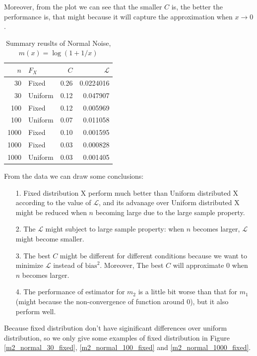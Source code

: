 \documentclass[twoside]{article}
\begin{document}
Moreover, from the plot we can see that the smaller $C$ is, the better the performance is, that might because it will capture the approximation when $x\to 0$.

\begin{table}[ht]
\centering
\caption{Summary reuslts of Normal Noise, $m(x)=\log(1+1/x)$}
\begin{tabular}{rlrr}
  \hline
  $n$ & $F_X$ & $C$ & $\mathcal{L}$ \\ 
  \hline
  30 & Fixed & 0.26 & 0.0224016 \\ 
  30 & Uniform & 0.12 & 0.047907\\ 
  \hline
  100 & Fixed & 0.12 & 0.005969\\
  100 & Uniform & 0.07 & 0.011058\\
  \hline
  1000 & Fixed & 0.10 & 0.001595\\
  1000 & Fixed & 0.03 & 0.000828\\
  1000 & Uniform & 0.03 & 0.001405\\
  \hline
\end{tabular}
\label{cu}
\end{table}

From the data we can draw some conclusions:

\begin{itemize}
  \item[1.] Fixed distribution X perform much better than Uniform distributed X according to the value of $\mathcal{L}$, and its advanage over Uniform distributed X might be reduced when $n$ becoming large due to the large sample property.
  \item[2.] The $\mathcal{L}$ might subject to large sample property: when $n$ becomes larger, $\mathcal{L}$ might become smaller.
  \item[3.] The best $C$ might be different for different conditions because we want to minimize $\mathcal{L}$ instead of $\mathrm{bias}^2$. Moreover, The best $C$ will approximate 0 when $n$ becomes larger.
  \item[4.] The performance of estimator for $m_2$ is a little bit worse than that for $m_1$(might because the non-convergence of function around $0$), but it also perform well.
\end{itemize}


Because fixed distribution don't have siginificant differences over uniform distribution, so we only give some examples of fixed distribution in Figure \ref{m2_normal_30_fixed}, \ref{m2_normal_100_fixed} and \ref{m2_normal_1000_fixed}.
\end{document}
